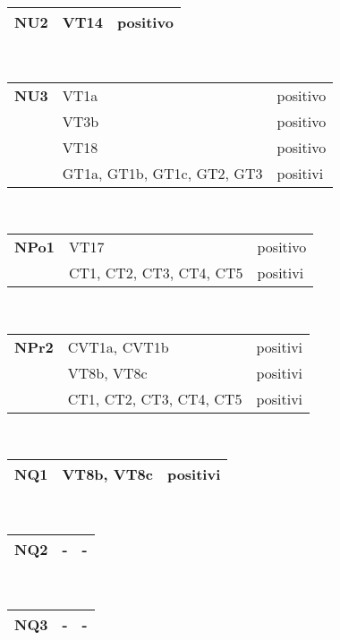  \begin{center}
\begin{tabular}{|p{2cm}|p{7cm}|p{2cm}|} \hline
\textbf{NU2} & VT14 & positivo\\ \hline
\end{tabular} \\
\end{center}

 \begin{center}
\begin{tabular}{|p{2cm}|p{7cm}|p{2cm}|} \hline
\textbf{NU3} & VT1a& positivo\\ \cline{2-3}
&  VT3b& positivo\\ \cline{2-3}
&  VT18& positivo\\ \cline{2-3}
&  GT1a, GT1b, GT1c, GT2, GT3 & positivi\\ \hline
\end{tabular} \\
\end{center}

 \begin{center}
\begin{tabular}{|p{2cm}|p{7cm}|p{2cm}|} \hline
\textbf{NPo1} &  VT17& positivo\\ \cline{2-3}
&  CT1, CT2, CT3, CT4, CT5 & positivi\\ \hline
\end{tabular} \\
\end{center}

 \begin{center}
\begin{tabular}{|p{2cm}|p{7cm}|p{2cm}|} \hline
\textbf{NPr2} &  CVT1a, CVT1b& positivi\\ \cline{2-3}
& VT8b, VT8c & positivi\\ \cline{2-3}
&  CT1, CT2, CT3, CT4, CT5 & positivi \\ \hline
\end{tabular} \\
\end{center}

 \begin{center}
\begin{tabular}{|p{2cm}|p{7cm}|p{2cm}|} \hline
\textbf{NQ1} & VT8b, VT8c & positivi \\ \hline
\end{tabular} \\
\end{center}

 \begin{center}
\begin{tabular}{|p{2cm}|p{7cm}|p{2cm}|} \hline
\textbf{NQ2} &  - & -\\ \hline
\end{tabular} \\
\end{center}

 \begin{center}
\begin{tabular}{|p{2cm}|p{7cm}|p{2cm}|} \hline
\textbf{NQ3} &  - & -\\ \hline
\end{tabular} \\
\end{center}

